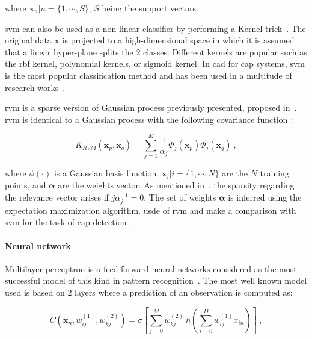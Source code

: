 \noindent where $\mathbf{x}_n|n=\{1,\cdots,S\}$, $S$ being the support vectors.

\ac{svm} can also be used as a non-linear classifier by performing a Kernel trick~\cite{Boser1992}.
The original data $\mathbf{x}$ is projected to a high-dimensional space in which it is assumed that a linear hyper-plane splits the 2 classes.
Different kernels are popular such as the \ac{rbf} kernel, polynomial kernels, or sigmoid kernel.
In \ac{cad} for \ac{cap} systems, \ac{svm} is the most popular classification method and has been used in a multitude of research works~\cite{Artan2009,Artan2010,Chan2003,Litjens2011,Litjens2012,Liu2013,Lopes2011,Niaf2011,Niaf2012,Ozer2009,Ozer2010,Parfait2012,Peng2013,Sung2011,Tiwari2012,Vos2008,Vos2008a,Vos2010,Vos2012,giannini2015fully,trigui2017automatic,lehaire2014computer,khalvati2015automated,chung2015prostate}.

\Acf{rvm} is a sparse version of Gaussian process previously presented, proposed in~\cite{Tipping2001}.
\ac{rvm} is identical to a Gaussian process with the following covariance function~\cite{Quinonero-Candela2002}:

\begin{equation}
	K_{RVM}(\mathbf{x}_p,\mathbf{x}_q) = \sum_{j=1}^{M} \frac{1}{\alpha_j} \Phi_j ( \mathbf{x}_p ) \Phi_j ( \mathbf{x}_q ) \ ,
 	\label{eq:rvm}
\end{equation}

\noindent where $\phi(\cdot)$ is a Gaussian basis function, $\mathbf{x}_i|i=\{1,\cdots,N\}$ are the $N$ training points, and $\boldsymbol{\alpha}$ are the weights vector.
As mentioned in~\cite{Quinonero-Candela2002}, the sparsity regarding the relevance vector arises if $j \alpha_j^{-1} = 0$.
The set of weights $\boldsymbol{\alpha}$ is inferred using the expectation maximization algorithm.
\citeauthor{Ozer2010} usde of \ac{rvm} and make a comparison with \ac{svm} for the task of \ac{cap} detection~\cite{Ozer2009,Ozer2010}.

\paragraph{Neural network} 
Multilayer perceptron is a feed-forward neural networks considered as the most successful model of this kind in pattern recognition~\cite{Bishop2006}.
The most well known model used is based on 2 layers where a prediction of an observation is computed as:

\begin{equation}
	C(\mathbf{x}_n,w_{ij}^{(1)},w_{kj}^{(2)}) = \sigma \left[ \sum_{j=0}^{M} w_{kj}^{(2)} \  h \left( \sum_{i=0}^{D} w_{ij}^{(1)} x_{in} \right) \right] \ ,
	\label{eq:annmlp}
\end{equation}

